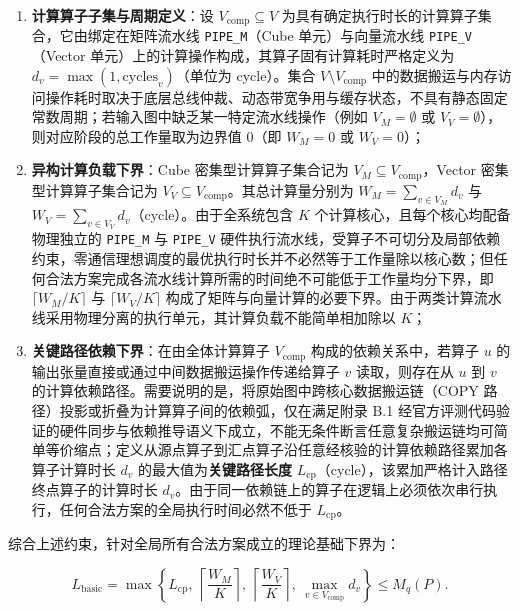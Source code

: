 \documentclass[anonymous,notoc]{gmcm2026}
\providecommand{\tightlist}{\setlength{\itemsep}{0pt}\setlength{\parskip}{0pt}}
\begin{document}
\begin{enumerate}
\def\labelenumi{\arabic{enumi}.}
\tightlist
\item
  \textbf{计算算子子集与周期定义}：设 \(V_{\mathrm{comp}} \subseteq V\) 为具有确定执行时长的计算算子集合，它由绑定在矩阵流水线 \texttt{PIPE\_M}（Cube 单元）与向量流水线 \texttt{PIPE\_V}（Vector 单元）上的计算操作构成，其算子固有计算耗时严格定义为 \(d_v = \max(1, \text{cycles}_v)\)（单位为 cycle）。集合 \(V \setminus V_{\mathrm{comp}}\) 中的数据搬运与内存访问操作耗时取决于底层总线仲裁、动态带宽争用与缓存状态，不具有静态固定常数周期；若输入图中缺乏某一特定流水线操作（例如 \(V_M = \emptyset\) 或 \(V_V = \emptyset\)），则对应阶段的总工作量取为边界值 0（即 \(W_M = 0\) 或 \(W_V = 0\)）；
\item
  \textbf{异构计算负载下界}：Cube 密集型计算算子集合记为 \(V_M \subseteq V_{\mathrm{comp}}\)，Vector 密集型计算算子集合记为 \(V_V \subseteq V_{\mathrm{comp}}\)。其总计算量分别为 \(W_M = \sum_{v \in V_M} d_v\) 与 \(W_V = \sum_{v \in V_V} d_v\)（cycle）。由于全系统包含 \(K\) 个计算核心，且每个核心均配备物理独立的 \texttt{PIPE\_M} 与 \texttt{PIPE\_V} 硬件执行流水线，受算子不可切分及局部依赖约束，零通信理想调度的最优执行时长并不必然等于工作量除以核心数；但任何合法方案完成各流水线计算所需的时间绝不可能低于工作量均分下界，即 \(\lceil W_M / K \rceil\) 与 \(\lceil W_V / K \rceil\) 构成了矩阵与向量计算的必要下界。由于两类计算流水线采用物理分离的执行单元，其计算负载不能简单相加除以 \(K\)；
\item
  \textbf{关键路径依赖下界}：在由全体计算算子 \(V_{\mathrm{comp}}\) 构成的依赖关系中，若算子 \(u\) 的输出张量直接或通过中间数据搬运操作传递给算子 \(v\) 读取，则存在从 \(u\) 到 \(v\) 的计算依赖路径。需要说明的是，将原始图中跨核心数据搬运链（COPY 路径）投影或折叠为计算算子间的依赖弧，仅在满足附录 B.1 经官方评测代码验证的硬件同步与依赖推导语义下成立，不能无条件断言任意复杂搬运链均可简单等价缩点；定义从源点算子到汇点算子沿任意经核验的计算依赖路径累加各算子计算时长 \(d_v\) 的最大值为\textbf{关键路径长度} \(L_{\mathrm{cp}}\)（cycle），该累加严格计入路径终点算子的计算时长 \(d_v\)。由于同一依赖链上的算子在逻辑上必须依次串行执行，任何合法方案的全局执行时间必然不低于 \(L_{\mathrm{cp}}\)。
\end{enumerate}

综合上述约束，针对全局所有合法方案成立的理论基础下界为：

\begin{equation}
L_{\mathrm{basic}} = \max\left\{L_{\mathrm{cp}},\ \left\lceil\frac{W_M}{K}\right\rceil,\ \left\lceil\frac{W_V}{K}\right\rceil,\ \max_{v\in V_{\mathrm{comp}}}d_v\right\} \le M_q(P).
\end{equation}
\end{document}
